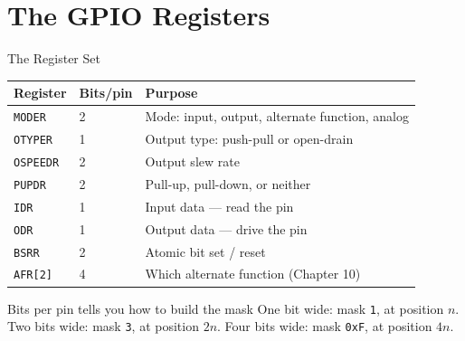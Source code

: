 \documentclass[9pt,aspectratio=169,xcolor=table]{beamer}
\newcommand{\striped}{\rowcolors{1}{white}{stripe}}
\begin{document}
\section{The GPIO Registers}

\begin{frame}{The Register Set}
    \begin{center}
    {\small
    \striped
    \begin{tabular}{@{}l l R{.50\textwidth}@{}}
        \toprule
        \textbf{Register} & \textbf{Bits/pin} & \textbf{Purpose} \\
        \midrule
        \texttt{MODER}   & 2 & Mode: input, output, alternate function, analog \\
        \texttt{OTYPER}  & 1 & Output type: push-pull or open-drain \\
        \texttt{OSPEEDR} & 2 & Output slew rate \\
        \texttt{PUPDR}   & 2 & Pull-up, pull-down, or neither \\
        \texttt{IDR}     & 1 & \alert{Input} data --- read the pin \\
        \texttt{ODR}     & 1 & \alert{Output} data --- drive the pin \\
        \texttt{BSRR}    & 2 & Atomic bit set / reset \\
        \texttt{AFR[2]}  & 4 & Which alternate function (Chapter 10) \\
        \bottomrule
    \end{tabular}}
    \end{center}

    \vspace{2mm}
    \begin{block}{Bits per pin tells you how to build the mask}
        One bit wide: mask \texttt{1}, at position $n$.
        Two bits wide: mask \texttt{3}, at position $2n$.
        Four bits wide: mask \texttt{0xF}, at position $4n$.
    \end{block}
\end{frame}
\end{document}
